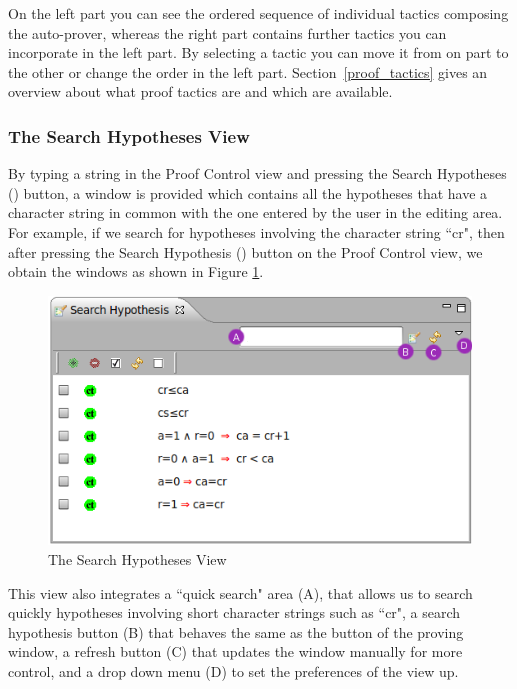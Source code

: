 On the left part you can see the ordered sequence of individual tactics composing the auto-prover, whereas the right part contains further tactics you can incorporate in the left part. By selecting a tactic you can move it from on part to the other or change the order in the left part.
Section~\ref{proof_tactics} gives an overview about what proof tactics are and 
  which are available.

\subsubsection{The Search Hypotheses View}

By typing a string in the \textsf{Proof Control} view and pressing the \textsf{Search Hypotheses} () button, a window is provided which contains all the  hypotheses that have a character string in common with the one entered by the user in the editing area. For example, if we search for hypotheses involving the character string ``cr", then after pressing the \textsf{Search Hypothesis} () button on the \textsf{Proof Control} view, we obtain the windows as shown in Figure \ref{fig_ref_01_proving_perspective7}. 

\begin{figure}[!ht]
\begin{center}
	\includegraphics{img/reference/ref_01_proving_perspective7.png}
	\caption{The Search Hypotheses View}
	\label{fig_ref_01_proving_perspective7}
\end{center}
\end{figure}

This view also integrates a ``quick search" area (A), that allows us to search quickly hypotheses involving short character strings such as ``cr", a search hypothesis button (B) that behaves the same as the button of the proving window, a refresh button (C) that updates the window manually for more control, and a drop down menu (D) to set the preferences of the view up.


